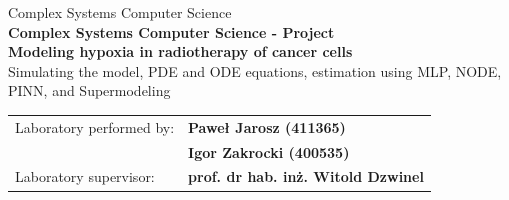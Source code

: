 \documentclass{article}
\begin{document}
\begin{center}
    Complex Systems Computer Science\\
    \vspace{130pt}
    \textbf{Complex Systems Computer Science - Project}\\
    \Huge\textbf{Modeling hypoxia in radiotherapy of cancer cells}\\
    \vspace{10pt}
    \Large{Simulating the model, PDE and ODE equations, estimation using MLP, NODE, PINN, and Supermodeling}\\
    \vspace{40pt}
\end{center}

\vfill

\begin{flushleft}
\vspace{1em}
    \begin{tabular}{l l}
    Laboratory performed by: & \textbf{Paweł Jarosz (411365)}\\
                             & \textbf{Igor Zakrocki (400535)}\\[5pt]
    Laboratory supervisor:   & \textbf{prof. dr hab. inż. Witold Dzwinel}\\
    \end{tabular}
\end{flushleft}

\newpage

\tableofcontents
\newpage

\begin{abstract}
This report presents a project on modeling the dynamics of a tumor subjected to radiotherapy in the presence of hypoxia (oxygen deprivation), which significantly reduces the effectiveness of irradiation.
The starting point is a diffusion-proliferation model with a radiation effect term (PDE).
Next, we construct reduced models: (i) an ordinary differential equation for the average tumor density (ODE),
(ii) a hybrid model with explicit dynamics of the normoxic/hypoxic fractions and oxygen, and (iii) a learned time step using an MLP.
In the second part of the report, we discuss the results of the sensitivity analysis (including the efficacy-toxicity tradeoff),
data assimilation procedures (ABC and 4D-Var), and hybrid approaches (Neural ODE, PINN, and SuperNet) used to accelerate
and improve the quality of predictions.
\end{abstract}
\end{document}
